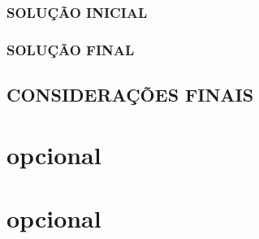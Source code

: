 \documentclass[a4paper,openright, oneside, article, 12pt, brazil]{abntex2}
\begin{document}
\subsection{SOLUÇÃO INICIAL}


\subsection{SOLUÇÃO FINAL}


\newpage
\section{CONSIDERAÇÕES FINAIS}



\newpage
\postextual



\anexos

\newpage
\chapter{opcional}


\apendices

\newpage
\chapter{opcional}

\end{document}
